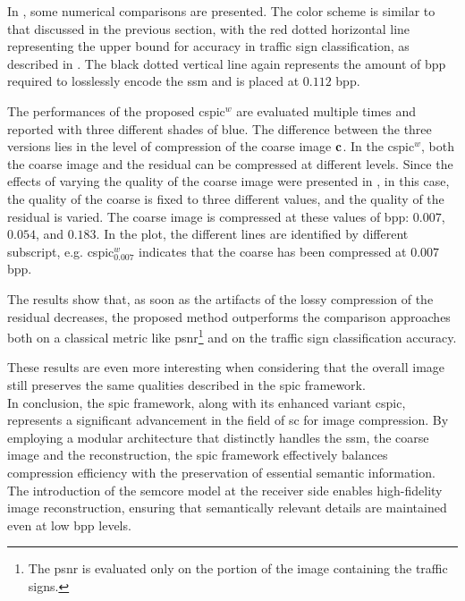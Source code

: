 In , some numerical comparisons are presented. The color scheme is similar to that discussed in the previous section, with the red dotted horizontal line representing the upper bound for accuracy in traffic sign classification, as described in . The black dotted vertical line again represents the amount of \gls{bpp} required to losslessly encode the \gls{ssm} and is placed at $0.112$ \gls{bpp}.

The performances of the proposed \gls{cspic}$^w$ are evaluated multiple times and reported with three different shades of blue. The difference between the three versions lies in the level of compression of the coarse image $\mathbf{c}$. In the \gls{cspic}$^w$, both the coarse image and the residual can be compressed at different levels. Since the effects of varying the quality of the coarse image were presented in , in this case, the quality of the coarse is fixed to three different values, and the quality of the residual is varied. The coarse image is compressed at these values of \gls{bpp}: $0.007$, $0.054$, and $0.183$. In the plot, the different lines are identified by different subscript, e.g. \gls{cspic}$_{0.007}^w$ indicates that the coarse has been compressed at $0.007$ \gls{bpp}.

The results show that, as soon as the artifacts of the lossy compression of the residual decreases, the proposed method outperforms the comparison approaches both on a classical metric like \gls{psnr}\footnote{The \gls{psnr} is evaluated only on the portion of the image containing the traffic signs.} and on the traffic sign classification accuracy.

These results are even more interesting when considering that the overall image still preserves the same qualities described in the \gls{spic} framework.\\


In conclusion, the \gls{spic} framework, along with its enhanced variant \gls{cspic}, represents a significant advancement in the field of \gls{sc} for image compression. By employing a modular architecture that distinctly handles the \gls{ssm}, the coarse image and the reconstruction, the \gls{spic} framework effectively balances compression efficiency with the preservation of essential semantic information. The introduction of the \gls{semcore} model at the receiver side enables high-fidelity image reconstruction, ensuring that semantically relevant details are maintained even at low \gls{bpp} levels.

